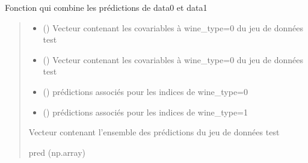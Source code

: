 \documentclass[letterpaper,10pt,french]{sphinxmanual}
\begin{document}

\begin{fulllineitems}
\label{\detokenize{general:general.build_pred}}
\pysigstartsignatures
{}
\pysigstopsignatures
\sphinxAtStartPar
Fonction qui combine les prédictions de data0 et data1
\begin{quote}\begin{description}
\begin{itemize}
\item {} 
\sphinxAtStartPar
{} () \textendash{} Vecteur contenant les co\sphinxhyphen{}variables à wine\_type=0 du jeu de données test

\item {} 
\sphinxAtStartPar
{} () \textendash{} Vecteur contenant les co\sphinxhyphen{}variables à wine\_type=0 du jeu de données test

\item {} 
\sphinxAtStartPar
{} () \textendash{} prédictions associés pour les indices de wine\_type=0

\item {} 
\sphinxAtStartPar
{} () \textendash{} prédictions associés pour les indices de wine\_type=1

\end{itemize}

\sphinxAtStartPar
Vecteur contenant l’ensemble des prédictions du jeu de données test

\sphinxAtStartPar
pred (np.array)

\end{description}\end{quote}

\end{fulllineitems}
\end{document}
